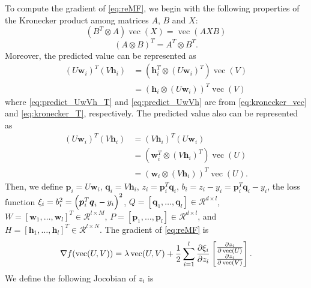 \documentclass[11pt,twoside]{article}
\newcommand{\bsym}[1]{\ensuremath{\boldsymbol{#1}}}
\newcommand{\bw}{\ensuremath{\bsym{w}}}
\newcommand{\bp}{\ensuremath{\bsym{p}}}
\newcommand{\bq}{\ensuremath{\bsym{q}}}
\newcommand{\bh}{\ensuremath{\bsym{h}}}
\newcommand{\bbr}{\ensuremath{\mathcal R}}
\DeclareMathOperator*{\vectorize}{vec}
\begin{document}
To compute the gradient of \eqref{eq:reMF}, we begin with the following properties of  the Kronecker product among matrices $A$, $B$ and $X$:
\begin{equation}
(B^T \otimes A)\vectorize(X) = \vectorize(AXB)
\label{eq:kronecker_vec}
\end{equation}
\begin{equation}
(A \otimes B)^T = A^T \otimes B^T
\label{eq:kronecker_T}.
\end{equation}
Moreover, the predicted value can be represented as
\begin{align}
(U \bw_i)^T (V \bh_i) &= (\bh_i^T \otimes (U \bw_i)^T)\vectorize(V)\label{eq:predict_UwVh_T} \\
&= (\bh_i \otimes (U \bw_i))^T\vectorize(V)
\label{eq:predict_UwVh}
\end{align}
where \eqref{eq:predict_UwVh_T} and \eqref{eq:predict_UwVh} are from \eqref{eq:kronecker_vec} and \eqref{eq:kronecker_T}, respectively.
The predicted value also can be represented as
\begin{align}
(U \bw_i)^T (V \bh_i) &= (V \bh_i)^T (U \bw_i) \nonumber \\
&= (\bw_i^T \otimes (V \bh_i)^T)\vectorize(U)\nonumber \\
&= (\bw_i \otimes (V \bh_i))^T \vectorize(U)
\label{eq:predict_VhUw}.
\end{align}
Then, we define $\bp_i = U\bw_i$, $\bq_i = V\bh_i$, $z_i = \bp_i^T\bq_i$, $b_i = z_i-y_i = \bp_i^T\bq_i-y_i$, the loss function $\xi_i = b_i^2 = \Bigl(\bp_i^T\bq_i-y_i\Bigr)^2$, $Q=[\bq_1,\dots,\bq_l] \in \bbr^{d\times l}$, $W=[\bw_1,\dots,\bw_l]^T \in \bbr^{l\times M}$, $P=[\bp_1,\dots,\bp_l] \in \bbr^{d\times l}$, and $H=[\bh_1,\dots,\bh_l]^T \in \bbr^{l\times N}$.
The gradient of \eqref{eq:reMF} is
\begin{align}
\nabla {f}(\vectorize(U, V)) = \lambda \vectorize(U,V) + \frac{1}{2}\sum_{i=1}^{l}\pdv{\xi_i}{z_i}\begin{bmatrix} \frac{\partial z_i}{\partial \vectorize(U)} \\ \frac{\partial z_i}{\partial \vectorize(V)} \end{bmatrix}
\label{eq:gradUV}.
\end{align}
We define the following Jocobian of $z_i$ is
\end{document}
